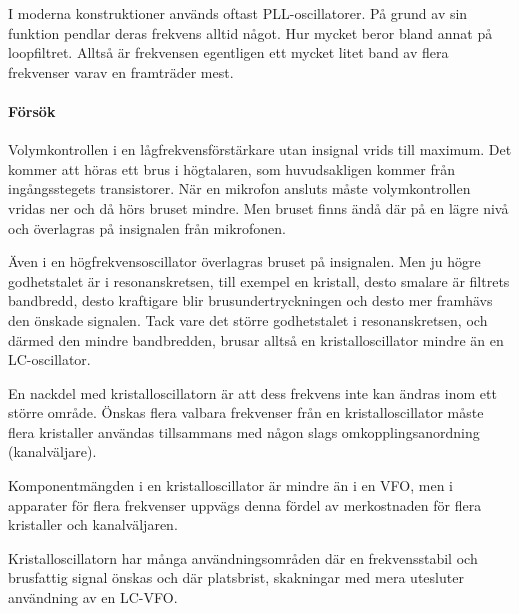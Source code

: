 I moderna konstruktioner används oftast PLL-oscillatorer.
På grund av sin funktion pendlar deras frekvens alltid något.
Hur mycket beror bland annat på loopfiltret.
Alltså är frekvensen egentligen ett mycket litet band av flera frekvenser varav
en framträder mest.

\paragraph{Försök}

Volymkontrollen i en lågfrekvensförstärkare utan insignal vrids till maximum.
Det kommer att höras ett brus i högtalaren, som huvudsakligen kommer från
ingångsstegets transistorer.
När en mikrofon ansluts måste volymkontrollen vridas ner och då hörs bruset
mindre.
Men bruset finns ändå där på en lägre nivå och överlagras på insignalen från
mikrofonen.

Även i en högfrekvensoscillator överlagras bruset på insignalen.
Men ju högre godhetstalet är i resonanskretsen, till exempel en kristall, desto
smalare är filtrets bandbredd, desto kraftigare blir brusundertryckningen och
desto mer framhävs den önskade signalen.
Tack vare det större godhetstalet i resonanskretsen, och därmed den mindre
bandbredden, brusar alltså en kristalloscillator mindre än en LC-oscillator.

En nackdel med kristalloscillatorn är att dess frekvens inte kan ändras inom 
ett större område.
Önskas flera valbara frekvenser från en kristalloscillator måste flera
kristaller användas tillsammans med någon slags omkopplingsanordning
(kanalväljare).

Komponentmängden i en kristalloscillator är mindre än i en VFO, men i
apparater för flera frekvenser uppvägs denna fördel av merkostnaden
för flera kristaller och kanalväljaren.

Kristalloscillatorn har många användningsområden där en
frekvensstabil och brusfattig signal önskas och där platsbrist,
skakningar med mera utesluter användning av en LC-VFO.
